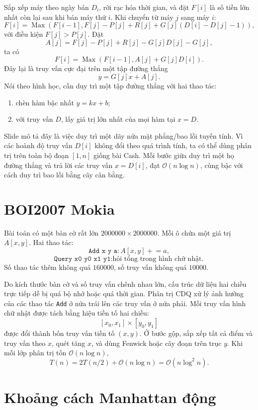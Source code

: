 \documentclass[11pt]{article}
\newcommand{\Oh}{\mathcal{O}}
\newcommand{\Max}{\operatorname{Max}}
\begin{document}
Sắp xếp máy theo ngày bán \(D_i\), rời rạc hóa thời gian, và đặt \(F[i]\) là
số tiền lớn nhất còn lại sau khi bán máy thứ \(i\). Khi chuyển từ máy \(j\)
sang máy \(i\):
\[
  F[i]=\Max\left(F[i-1],
  F[j]-P[j]+R[j]+G[j](D[i]-D[j]-1)\right),
\]
với điều kiện \(F[j]>P[j]\). Đặt
\[
  A[j]=F[j]-P[j]+R[j]-G[j]D[j]-G[j],
\]
ta có
\[
  F[i]=\Max\left(F[i-1],A[j]+G[j]D[i]\right).
\]
Đây lại là truy vấn cực đại trên một tập đường thẳng
\[
  y=G[j]x+A[j].
\]
Nói theo hình học, cần duy trì một tập đường thẳng với hai thao tác:
\begin{enumerate}
  \item chèn hàm bậc nhất \(y=kx+b\);
  \item với truy vấn \(D\), lấy giá trị lớn nhất của mọi hàm tại \(x=D\).
\end{enumerate}
Slide mô tả đây là việc duy trì một dãy nửa mặt phẳng/bao lồi tuyến tính. Vì
các hoành độ truy vấn \(D[i]\) không đổi theo quá trình tính, ta có thể dùng
phân trị trên toàn bộ đoạn \([1,n]\) giống bài Cash. Mỗi bước giữa duy trì một
họ đường thẳng và trả lời các truy vấn \(x=D[i]\), đạt \(\Oh(n\log n)\), cùng
bậc với cách duy trì bao lồi bằng cây cân bằng.

\section{BOI2007 Mokia}

Bài toán có một bàn cờ rất lớn \(2000000\times 2000000\). Mỗi ô chứa một giá
trị \(A[x,y]\). Hai thao tác:
\[
  \texttt{Add x y a}: A[x,y]\mathrel{+}=a,
\]
\[
  \texttt{Query x0 y0 x1 y1}: \text{hỏi tổng trong hình chữ nhật.}
\]
Số thao tác thêm không quá \(160000\), số truy vấn không quá \(10000\).

Do kích thước bàn cờ và số truy vấn chênh nhau lớn, cấu trúc dữ liệu hai
chiều trực tiếp dễ bị quá bộ nhớ hoặc quá thời gian. Phân trị CDQ xử lý ảnh
hưởng của các thao tác \texttt{Add} ở nửa trái lên các truy vấn ở nửa phải.
Mỗi truy vấn hình chữ nhật được tách bằng hiệu tiền tố hai chiều:
\[
  [x_0,x_1]\times[y_0,y_1]
\]
được đổi thành bốn truy vấn tiền tố \((x,y)\). Ở bước gộp, sắp xếp tất cả
điểm và truy vấn theo \(x\), quét tăng \(x\), và dùng Fenwick hoặc cây đoạn
trên trục \(y\). Khi mỗi lớp phân trị tốn \(\Oh(n\log n)\),
\[
  T(n)=2T(n/2)+\Oh(n\log n)=\Oh(n\log^2 n).
\]

\section{Khoảng cách Manhattan động}
\end{document}
